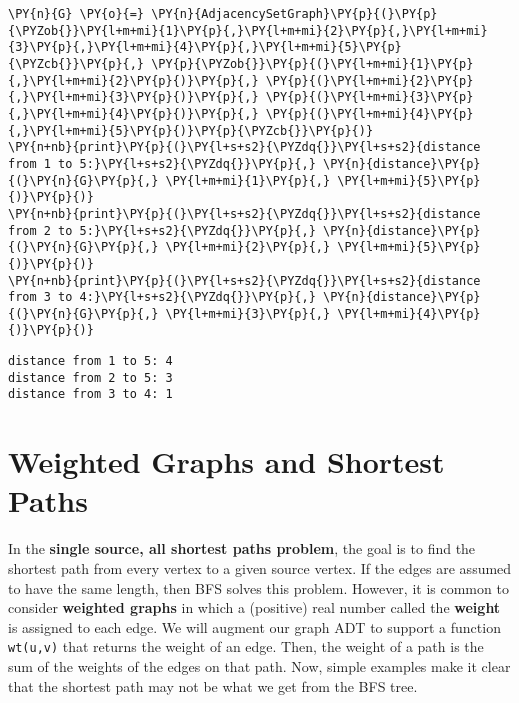 \begin{Verbatim}[commandchars=\\\{\}]
\PY{n}{G} \PY{o}{=} \PY{n}{AdjacencySetGraph}\PY{p}{(}\PY{p}{\PYZob{}}\PY{l+m+mi}{1}\PY{p}{,}\PY{l+m+mi}{2}\PY{p}{,}\PY{l+m+mi}{3}\PY{p}{,}\PY{l+m+mi}{4}\PY{p}{,}\PY{l+m+mi}{5}\PY{p}{\PYZcb{}}\PY{p}{,} \PY{p}{\PYZob{}}\PY{p}{(}\PY{l+m+mi}{1}\PY{p}{,}\PY{l+m+mi}{2}\PY{p}{)}\PY{p}{,} \PY{p}{(}\PY{l+m+mi}{2}\PY{p}{,}\PY{l+m+mi}{3}\PY{p}{)}\PY{p}{,} \PY{p}{(}\PY{l+m+mi}{3}\PY{p}{,}\PY{l+m+mi}{4}\PY{p}{)}\PY{p}{,} \PY{p}{(}\PY{l+m+mi}{4}\PY{p}{,}\PY{l+m+mi}{5}\PY{p}{)}\PY{p}{\PYZcb{}}\PY{p}{)}
\PY{n+nb}{print}\PY{p}{(}\PY{l+s+s2}{\PYZdq{}}\PY{l+s+s2}{distance from 1 to 5:}\PY{l+s+s2}{\PYZdq{}}\PY{p}{,} \PY{n}{distance}\PY{p}{(}\PY{n}{G}\PY{p}{,} \PY{l+m+mi}{1}\PY{p}{,} \PY{l+m+mi}{5}\PY{p}{)}\PY{p}{)}
\PY{n+nb}{print}\PY{p}{(}\PY{l+s+s2}{\PYZdq{}}\PY{l+s+s2}{distance from 2 to 5:}\PY{l+s+s2}{\PYZdq{}}\PY{p}{,} \PY{n}{distance}\PY{p}{(}\PY{n}{G}\PY{p}{,} \PY{l+m+mi}{2}\PY{p}{,} \PY{l+m+mi}{5}\PY{p}{)}\PY{p}{)}
\PY{n+nb}{print}\PY{p}{(}\PY{l+s+s2}{\PYZdq{}}\PY{l+s+s2}{distance from 3 to 4:}\PY{l+s+s2}{\PYZdq{}}\PY{p}{,} \PY{n}{distance}\PY{p}{(}\PY{n}{G}\PY{p}{,} \PY{l+m+mi}{3}\PY{p}{,} \PY{l+m+mi}{4}\PY{p}{)}\PY{p}{)}
\end{Verbatim}

\begin{Verbatim}
distance from 1 to 5: 4
distance from 2 to 5: 3
distance from 3 to 4: 1

\end{Verbatim}

\section{Weighted Graphs and Shortest Paths}


In the \textbf{single source, all shortest paths problem}, the goal is to find the shortest path from every vertex to a given source vertex.
If the edges are assumed to have the same length, then BFS solves this problem.
However, it is common to consider \textbf{weighted graphs} in which a (positive) real number called the \textbf{weight} is assigned to each edge.
We will augment our graph ADT to support a function \texttt{wt(u,v)} that returns the weight of an edge.
Then, the weight of a path is the sum of the weights of the edges on that path.
Now, simple examples make it clear that the shortest path may not be what we get from the BFS tree.

